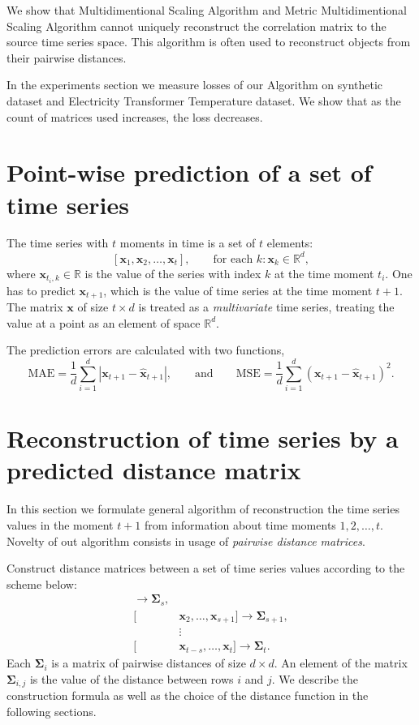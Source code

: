 \documentclass[12pt]{article}
\begin{document}
	We show that Multidimentional Scaling Algorithm \cite{MDS} and Metric Multidimentional Scaling Algorithm \cite{inbook} cannot uniquely reconstruct the correlation matrix to the source time series space. This algorithm is often used to reconstruct objects from their pairwise distances.
	
	In the experiments section we measure losses of our Algorithm on synthetic dataset and Electricity Transformer Temperature dataset. We show that as the count of matrices used increases, the loss decreases.

\section{Point-wise prediction of a set of time series}

The time series with $t$ moments in time is a set of $t$ elements:
\[
[\mathbf{x}_1, \mathbf{x}_2, \ldots, \mathbf{x}_t],\qquad \text{for each } k: \mathbf{x}_k \in \mathbb{R}^d,
\]
where $\mathbf{x}_{t_i, k} \in \mathbb{R}$ is the value of the series with index $k$ at the time moment $t_i$.
One has to predict $\mathbf{x}_{t+1}$, which is the value of time series at the time moment $t+1$. The matrix $\mathbf{x}$ of size $t \times d$ is treated as a \emph{multivariate} time series, treating the value at a point as an element of space $\mathbb{R}^d$.

The prediction errors are calculated with two functions,
\[
\text{MAE} = \frac{1}{d}{\sum_{i=1}^{d} |\mathbf{x}_{t+1} - \mathbf{\hat{x}}_{t+1}|}, 
\qquad \text{and} \qquad 
\text{MSE} = \frac{1}{d}{\sum_{i=1}^{d} (\mathbf{x}_{t+1} - \mathbf{\hat{x}}_{t+1})^2}. \tag{*} \label{loss}
\]

\section{Reconstruction of time series by a predicted distance matrix}

In this section we formulate general algorithm of reconstruction the time series values in the moment $t+1$ from information about time moments $1, 2, \ldots, t$. Novelty of out algorithm consists in usage of \emph{pairwise distance matrices}.

Construct distance matrices between a set of time series values according to the scheme below:
\begin{align*}
	[&\mathbf{x}_1, \ldots, \mathbf{x}_s] \rightarrow \mathbf{\Sigma}_s, \\
	[&\mathbf{x}_2, \ldots, \mathbf{x}_{s+1}] \rightarrow \mathbf{\Sigma}_{s+1}, \\
	&\vdots \\
	[&\mathbf{x}_{t-s}, \ldots, \mathbf{x}_t] \rightarrow \mathbf{\Sigma}_{t}.
\end{align*}
Each $\mathbf{\Sigma}_i$ is a matrix of pairwise distances of size $d \times d$. An element of the matrix $\mathbf{\Sigma}_{i,j}$ is the value of the distance between rows $i$ and $j$. We describe the construction formula as well as the choice of the distance function in the following sections.
\end{document}
